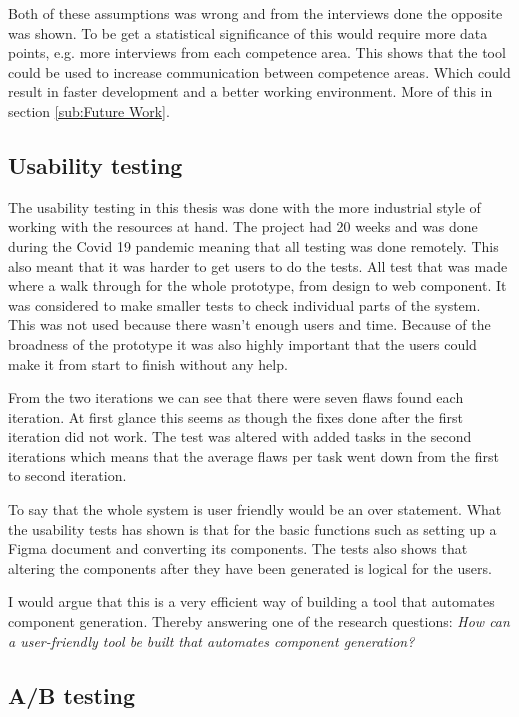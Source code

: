 Both of these assumptions was wrong and from the interviews done the opposite was shown. To be get a statistical significance of this would require more data points, e.g. more interviews from each competence area. This shows that the tool could be used to increase communication between competence areas. Which could result in faster development and a better working environment. More of this in section \ref{sub:Future Work}.

\subsection{Usability testing}%
\label{sub:Usability testing}
The usability testing in this thesis was done with the more industrial style of working with the resources at hand. The project had 20 weeks and was done during the Covid 19 pandemic meaning that all testing was done remotely. This also meant that it was harder to get users to do the tests. All test that was made where a walk through for the whole prototype, from design to web component. It was considered to make smaller tests to check individual parts of the system. This was not used because there wasn't enough users and time. Because of the broadness of the prototype it was also highly important that the users could make it from start to finish without any help. 

From the two iterations we can see that there were seven flaws found each iteration. At first glance this seems as though the fixes done after the first iteration did not work. The test was altered with added tasks in the second iterations which means that the average flaws per task went down from the first to second iteration. 

To say that the whole system is user friendly would be an over statement. What the usability tests has shown is that for the basic functions such as setting up a Figma document and converting its components. The tests also shows that altering the components after they have been generated is logical for the users. 

I would argue that this is a very efficient way of building a tool that automates component generation. Thereby answering one of the research questions: \textit{How can a user-friendly tool be built that automates component generation?}

\subsection{A/B testing}%
\label{sub:A/B testing}



